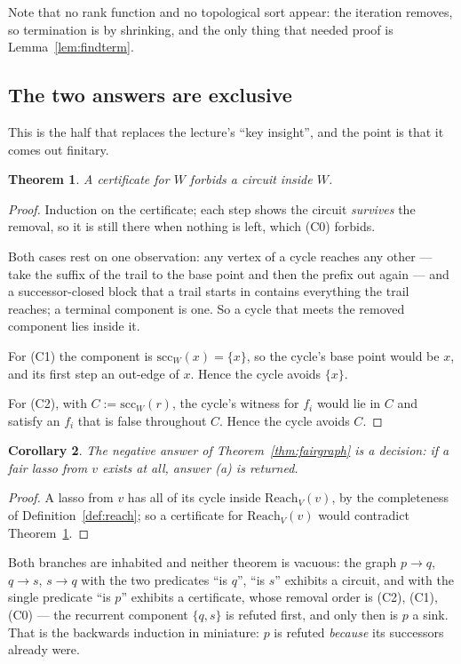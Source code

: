 \documentclass[11pt,a4paper]{article}
\newtheorem{theorem}{Theorem}[section]
\newtheorem{corollary}[theorem]{Corollary}
\theoremstyle{definition}
\newcommand{\Reach}{\mathrm{Reach}}
\begin{document}
Note that no rank function and no topological sort appear: the iteration
removes, so termination is by shrinking, and the only thing that needed proof
is Lemma~\ref{lem:findterm}.

\subsection*{The two answers are exclusive}

This is the half that replaces the lecture's ``key insight'', and the point is
that it comes out finitary.

\begin{theorem}\label{thm:nocirc}
A certificate for $W$ forbids a circuit inside $W$.
\end{theorem}

\begin{proof}
Induction on the certificate; each step shows the circuit \emph{survives} the
removal, so it is still there when nothing is left, which (C0) forbids.

Both cases rest on one observation: any vertex of a cycle reaches any other ---
take the suffix of the trail to the base point and then the prefix out again ---
and a successor-closed block that a trail starts in contains everything the
trail reaches; a terminal component is one.  So a cycle that meets the removed
component lies inside it.

For (C1) the component is $\mathrm{scc}_W(x)=\{x\}$, so the cycle's base point
would be $x$, and its first step an out-edge of $x$.  Hence the cycle avoids
$\{x\}$.

For (C2), with $C:=\mathrm{scc}_W(r)$, the cycle's witness for $f_i$ would lie
in $C$ and satisfy an $f_i$ that is false throughout $C$.  Hence the cycle
avoids $C$.
\end{proof}

\begin{corollary}\label{cor:decision}
The negative answer of Theorem~\ref{thm:fairgraph} is a decision: if a fair
lasso from $v$ exists at all, answer (a) is returned.
\end{corollary}

\begin{proof}
A lasso from $v$ has all of its cycle inside $\Reach_V(v)$, by the completeness
of Definition~\ref{def:reach}; so a certificate for $\Reach_V(v)$ would
contradict Theorem~\ref{thm:nocirc}.
\end{proof}

Both branches are inhabited and neither theorem is vacuous: the graph
$p\to q$, $q\to s$, $s\to q$ with the two predicates ``is $q$'', ``is $s$''
exhibits a circuit, and with the single predicate ``is $p$'' exhibits a
certificate, whose removal order is (C2), (C1), (C0) --- the recurrent
component $\{q,s\}$ is refuted first, and only then is $p$ a sink.  That is the
backwards induction in miniature: $p$ is refuted \emph{because} its successors
already were.
\end{document}
